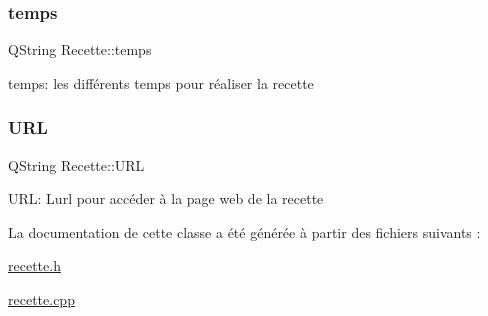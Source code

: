 \subsubsection{\texorpdfstring{temps}{temps}}
{\footnotesize\ttfamily Q\+String Recette\+::temps\hspace{0.3cm}{\ttfamily [private]}}

temps\+: les différents temps pour réaliser la recette \mbox{\label{classRecette_a7e0fe7b2bce6f2936644636180455649}} 
\subsubsection{\texorpdfstring{U\+RL}{URL}}
{\footnotesize\ttfamily Q\+String Recette\+::\+U\+RL\hspace{0.3cm}{\ttfamily [private]}}

U\+RL\+: L\textquotesingle{}url pour accéder à la page web de la recette 

La documentation de cette classe a été générée à partir des fichiers suivants \+:\begin{DoxyCompactItemize}
\item 
\hyperlink{recette_8h}{recette.\+h}\item 
\hyperlink{recette_8cpp}{recette.\+cpp}\end{DoxyCompactItemize}
